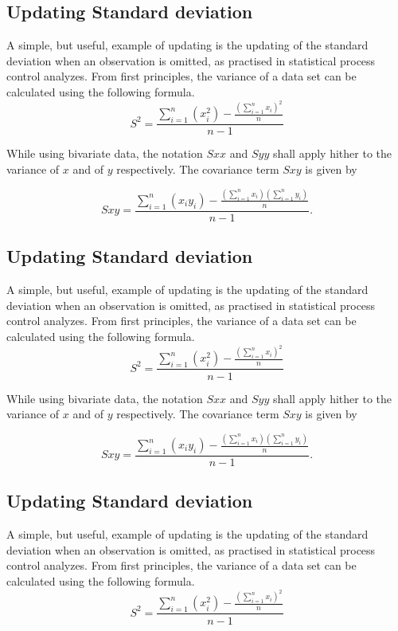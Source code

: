 \documentclass[MAIN.tex]{subfiles}
\begin{document}
\subsection{Updating Standard deviation}
A simple, but useful, example of updating is the updating of the standard deviation when an observation is omitted, as practised in statistical process control analyzes. From first principles, the variance of a data set can be calculated using the following formula.
\begin{equation}
S^{2}=\frac{\sum_{i=1}^{n}(x_{i}^{2})-\frac{(\sum_{i=1}^{n}x_{i})^{2}}{n}}{n-1}
\end{equation}

While using bivariate data, the notation $Sxx$ and $Syy$ shall apply hither to the variance of $x$ and of $y$ respectively. The covariance term $Sxy$ is given by

\begin{equation}
Sxy=\frac{\sum_{i=1}^{n}(x_{i}y_{i})-\frac{(\sum_{i=1}^{n}x_{i})(\sum_{i=1}^{n}y_{i})}{n}}{n-1}.
\end{equation}


\newpage
	\subsection{Updating Standard deviation}
	A simple, but useful, example of updating is the updating of the standard deviation when an observation is omitted, as practised in statistical process control analyzes. From first principles, the variance of a data set can be calculated using the following formula.
	\begin{equation}
	S^{2}=\frac{\sum_{i=1}^{n}(x_{i}^{2})-\frac{(\sum_{i=1}^{n}x_{i})^{2}}{n}}{n-1}
	\end{equation}
	
	While using bivariate data, the notation $Sxx$ and $Syy$ shall apply hither to the variance of $x$ and of $y$ respectively. The covariance term $Sxy$ is given by
	
	\begin{equation}
	Sxy=\frac{\sum_{i=1}^{n}(x_{i}y_{i})-\frac{(\sum_{i=1}^{n}x_{i})(\sum_{i=1}^{n}y_{i})}{n}}{n-1}.
	\end{equation}
	
	
	
	
	

\subsection{Updating Standard deviation}
A simple, but useful, example of updating is the updating of the standard deviation when an observation is omitted, as practised in statistical process control analyzes. From first principles, the variance of a data set can be calculated using the following formula.
\begin{equation}
S^{2}=\frac{\sum_{i=1}^{n}(x_{i}^{2})-\frac{(\sum_{i=1}^{n}x_{i})^{2}}{n}}{n-1}
\end{equation}
\end{document}
